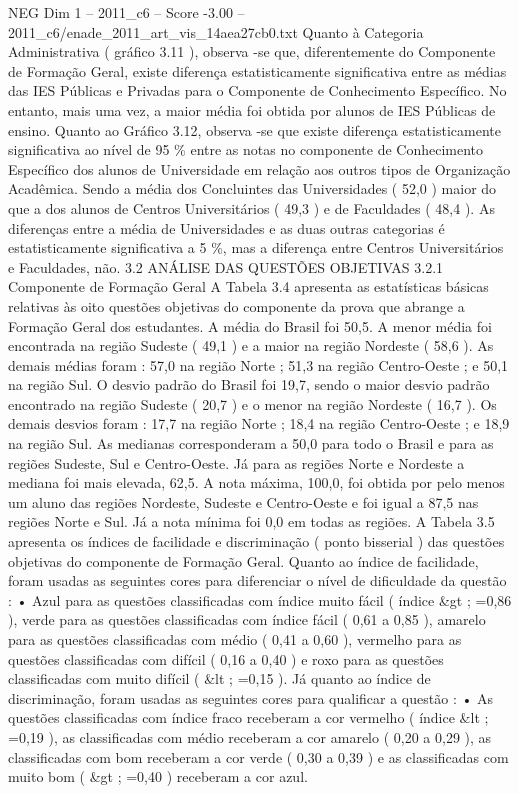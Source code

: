 \begin{textsample}{NEG Dim 1 – 2011\_c6 – Score -3.00 – 2011\_c6/enade\_2011\_art\_vis\_14aea27cb0.txt}
Quanto à Categoria Administrativa ( gráfico 3.11 ), observa -se que, diferentemente do Componente de Formação Geral, existe diferença estatisticamente significativa entre as médias das IES Públicas e Privadas para o Componente de Conhecimento Específico.
No entanto, mais uma vez, a maior média foi obtida por alunos de IES Públicas de ensino.
Quanto ao Gráfico 3.12, observa -se que existe diferença estatisticamente significativa ao nível de 95 \% entre as notas no componente de Conhecimento Específico dos alunos de Universidade em relação aos outros tipos de Organização Acadêmica.
Sendo a média dos Concluintes das Universidades ( 52,0 ) maior do que a dos alunos de Centros Universitários ( 49,3 ) e de Faculdades ( 48,4 ).
As diferenças entre a média de Universidades e as duas outras categorias é estatisticamente significativa a 5 \%, mas a diferença entre Centros Universitários e Faculdades, não. 3.2 ANÁLISE DAS QUESTÕES OBJETIVAS 3.2.1 Componente de Formação Geral A Tabela 3.4 apresenta as estatísticas básicas relativas às oito questões objetivas do componente da prova que abrange a Formação Geral dos estudantes.
A média do Brasil foi 50,5.
A menor média foi encontrada na região Sudeste ( 49,1 ) e a maior na região Nordeste ( 58,6 ).
As demais médias foram : 57,0 na região Norte ; 51,3 na região Centro-Oeste ; e 50,1 na região Sul.
O desvio padrão do Brasil foi 19,7, sendo o maior desvio padrão encontrado na região Sudeste ( 20,7 ) e o menor na região Nordeste ( 16,7 ).
Os demais desvios foram : 17,7 na região Norte ; 18,4 na região Centro-Oeste ; e 18,9 na região Sul.
As medianas corresponderam a 50,0 para todo o Brasil e para as regiões Sudeste, Sul e Centro-Oeste.
Já para as regiões Norte e Nordeste a mediana foi mais elevada, 62,5.
A nota máxima, 100,0, foi obtida por pelo menos um aluno das regiões Nordeste, Sudeste e Centro-Oeste e foi igual a 87,5 nas regiões Norte e Sul.
Já a nota mínima foi 0,0 em todas as regiões.
A Tabela 3.5 apresenta os índices de facilidade e discriminação ( ponto bisserial ) das questões objetivas do componente de Formação Geral.
Quanto ao índice de facilidade, foram usadas as seguintes cores para diferenciar o nível de dificuldade da questão : • Azul para as questões classificadas com índice muito fácil ( índice \&gt ; =0,86 ), verde para as questões classificadas com índice fácil ( 0,61 a 0,85 ), amarelo para as questões classificadas com médio ( 0,41 a 0,60 ), vermelho para as questões classificadas com difícil ( 0,16 a 0,40 ) e roxo para as questões classificadas com muito difícil ( \&lt ; =0,15 ).
Já quanto ao índice de discriminação, foram usadas as seguintes cores para qualificar a questão : • As questões classificadas com índice fraco receberam a cor vermelho ( índice \&lt ; =0,19 ), as classificadas com médio receberam a cor amarelo ( 0,20 a 0,29 ), as classificadas com bom receberam a cor verde ( 0,30 a 0,39 ) e as classificadas com muito bom ( \&gt ; =0,40 ) receberam a cor azul.

\end{textsample}

